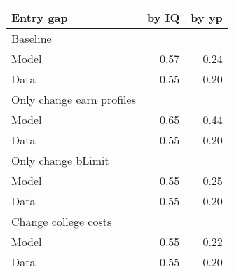 \begin{tabular}{lrr}
\hline
Entry gap & by IQ  & by yp  \\
\hline
Baseline &   &   \\
Model & 0.57  & 0.24  \\
Data & 0.55  & 0.20  \\
Only change earn profiles &   &   \\
Model & 0.65  & 0.44  \\
Data & 0.55  & 0.20  \\
Only change bLimit &   &   \\
Model & 0.55  & 0.25  \\
Data & 0.55  & 0.20  \\
Change college costs &   &   \\
Model & 0.55  & 0.22  \\
Data & 0.55  & 0.20  \\
\hline
\end{tabular}%
